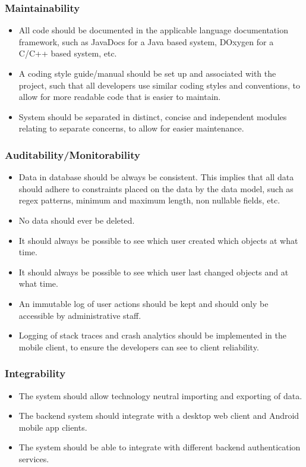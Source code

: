 \documentclass[a4paper,10pt]{article}
\begin{document}
\subsubsection{Maintainability}
\begin{itemize}
\item All code should be documented in the applicable language documentation framework, such as JavaDocs for a Java based system, DOxygen for a C/C++ based system, etc.
\item A coding style guide/manual should be set up and associated with the project, such that all developers use similar coding styles and conventions, to allow for more readable code that is easier to maintain.
\item System should be separated in distinct, concise and independent modules relating to separate concerns, to allow for easier maintenance.
\end{itemize}

\subsubsection{Auditability/Monitorability}
\begin{itemize}
\item Data in database should be always be consistent. This implies that all data should adhere to constraints placed on the data by the data model, such as regex patterns, minimum and maximum length, non nullable fields, etc.
\item No data should ever be deleted.
\item It should always be possible to see which user created which objects at what time.
\item It should always be possible to see which user last changed objects and at what time.
\item An immutable log of user actions should be kept and should only be accessible by administrative staff.
\item Logging of stack traces and crash analytics should be implemented in the mobile client, to ensure the developers can see to client reliability.
\end{itemize}

\subsubsection{Integrability}
\begin{itemize}
\item The system should allow technology neutral importing and exporting of data.
\item The backend system should integrate with a desktop web client and Android mobile app clients.
\item The system should be able to integrate with different backend authentication services.
\end{itemize}
\end{document}
